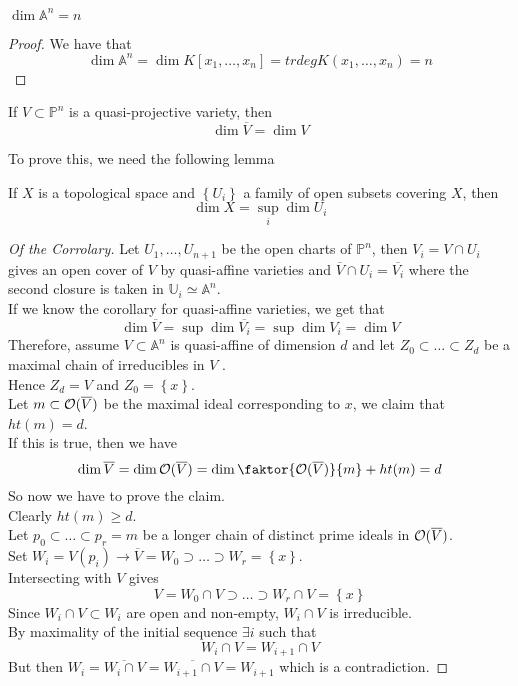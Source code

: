 \documentclass[../main.tex]{subfiles}
\begin{document}
\begin{crly}
$\dim \mathbb{A}^{n}= n$ 
\end{crly}
\begin{proof}
We have that
\[ 
\dim \mathbb{A}^{n}= \dim K [ x_1,\ldots, x_n] = trdeg K( x_1,\ldots,x_n) = n
\]
\end{proof}
\begin{crly}
If $V \subset \mathbb{P}^{n}$ is a quasi-projective variety, then
\[ 
\dim \overline{V} = \dim V
\]

\end{crly}
To prove this, we need the following lemma
\begin{lemma}
If $X$ is a topological space and $ \left\{ U_i \right\} $ a family of open subsets covering $X$, then
\[ 
\dim X = \sup_i \dim U_i
\]

\end{lemma}
\begin{proof}[Of the Corrolary]
Let $U_1,\ldots, U_{n+1} $ be the open charts of $ \mathbb{P}^{n}$, then $V_i = V \cap U_i$ gives an open cover of $V$ by quasi-affine varieties and $\overline{V}\cap U_i = \overline{V_i}$ where the second closure is taken in $\mathbb{U}_i \simeq \mathbb{A}^{n}$.\\
If we know the corollary for quasi-affine varieties, we get that
\[ 
\dim \overline{V} = \sup \dim \overline{V_i}= \sup \dim V_i = \dim V
\]
Therefore, assume $V \subset \mathbb{A}^{n}$ is quasi-affine of dimension $d$ and let $Z_0 \subset \ldots \subset Z_d$ be a maximal chain of irreducibles in $V$ .\\
Hence $Z_d = V $ and $Z_0 = \left\{ x \right\} $.\\
Let $m \subset \mathcal{O}( \overline{V}) $ be the maximal ideal corresponding to $x$, we claim that $ht( m) = d$.\\
If this is true, then we have
\[ 
\dim \overline{V}= \dim \O( \overline{V}) = \dim  \faktor{ \O(\overline{V}) } { m}  + ht( m) = d 
\]
So now we have to prove the claim.\\
Clearly $ht( m) \geq d$.\\
Let $p_{0} \subset \ldots \subset p_r=m$ be a longer chain of distinct prime ideals in $ \mathcal{O}( \overline{V}) $.\\
Set $W_i = V( p_i) \to \overline{V} = W_0 \supset \ldots \supset W_r = \left\{ x \right\} $.\\
Intersecting with $V$ gives 
\[ 
	V = W_{0} \cap V \supset \ldots \supset W_r \cap V = \left\{ x \right\} 
\]
Since $W_i \cap V \subset W_i$ are open and non-empty, $W_i \cap V$ is irreducible.\\
By maximality of the initial sequence $\exists i$ such that 
\[ 
W_i \cap V = W_{i+1} \cap V 
\]
But then $W_i = \overline { W_i \cap V} = \overline { W_{i+1} \cap V} = W_{i+1} $ which is a contradiction.
\end{proof}
\end{document}
